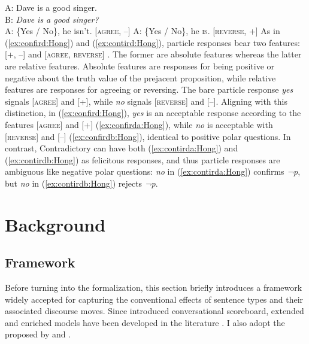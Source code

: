 \documentclass[output=paper,colorlinks,citecolor=brown]{langscibook}
\begin{document}
\ea \label{ex:contird:Hong}
    A: Dave is a good singer.\\
    B: \textit{Dave is a good singer?}\\
         \ea\label{ex:contirda:Hong} A: \{Yes / No\}, he isn't. \hfill[\textsc{agree}, --]
         \ex\label{ex:contirdb:Hong} A: \{Yes / No\}, he \textsc{is}. \hfill[\textsc{reverse}, +]
    \z
\z
As in (\ref{ex:confird:Hong}) and (\ref{ex:contird:Hong}), particle responses bear two features: [+, --] and [\textsc{agree}, \textsc{reverse}] \citep{roelofsen2015polarity}. The former are absolute features whereas the latter are relative features. Absolute features are responses for being positive or negative about the truth value of the prejacent proposition, while relative features are responses for agreeing or reversing. The bare particle response \textit{yes} signals [\textsc{agree}] and [+], while \textit{no} signals [\textsc{reverse}] and [--]. Aligning with this distinction, in (\ref{ex:confird:Hong}), \textit{yes} is an acceptable response according to the features [\textsc{agree}] and [+] (\ref{ex:confirda:Hong}), while \textit{no} is acceptable with [\textsc{reverse}] and [--] (\ref{ex:confirdb:Hong}), identical to positive polar questions. In contrast, Contradictory  can have both (\ref{ex:contirda:Hong}) and (\ref{ex:contirdb:Hong}) as felicitous responses, and thus particle responses are ambiguous like negative polar questions: \textit{no} in (\ref{ex:contirda:Hong}) confirms \textit{¬p}, but \textit{no} in (\ref{ex:contirdb:Hong}) rejects \textit{¬p}.

\section{Background}
\label{sec:back:Hong}
\subsection{Framework}
\label{sec:frame:Hong}

Before turning into the formalization, this section briefly introduces a framework widely accepted for capturing the conventional effects of sentence types and their associated discourse moves. Since \citet{lewis1979scorekeeping} introduced conversational scoreboard, extended and enriched models have been developed in the literature \citep[e.g.,][]{farkas2010reacting, malamud2015three, rudin2022intonational}. I also adopt the  proposed by \citet{farkas2010reacting} and \citet{malamud2015three}.
\end{document}
